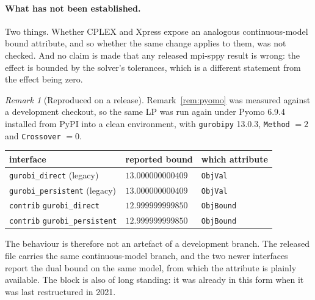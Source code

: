 \documentclass[11pt]{article}
\theoremstyle{plain}
\theoremstyle{remark}
\newtheorem{remark}[lemma]{Remark}
\begin{document}
\paragraph{What has not been established.}
Two things.  Whether CPLEX and Xpress expose an analogous continuous-model
bound attribute, and so whether the same change applies to them, was not
checked.  And no claim is made that any released mpi-sppy result is wrong: the
effect is bounded by the solver's tolerances, which is a different statement
from the effect being zero.

\begin{remark}[Reproduced on a release]\label{rem:release}
Remark~\ref{rem:pyomo} was measured against a development checkout, so the
same LP was run again under Pyomo 6.9.4 installed from PyPI into a clean
environment, with \texttt{gurobipy} 13.0.3, \texttt{Method} $=2$ and
\texttt{Crossover} $=0$.

\begin{center}
\begin{tabular}{lll}
\toprule
interface & reported bound & which attribute \\
\midrule
\texttt{gurobi\_direct} (legacy)     & $13.000000000409$ & \texttt{ObjVal} \\
\texttt{gurobi\_persistent} (legacy) & $13.000000000409$ & \texttt{ObjVal} \\
\texttt{contrib} \texttt{gurobi\_direct}     & $12.999999999850$ & \texttt{ObjBound} \\
\texttt{contrib} \texttt{gurobi\_persistent} & $12.999999999850$ & \texttt{ObjBound} \\
\bottomrule
\end{tabular}
\end{center}

The behaviour is therefore not an artefact of a development branch.  The
released file carries the same continuous-model branch, and the two newer
interfaces report the dual bound on the same model, from which the attribute
is plainly available.  The block is also of long standing: it was already in
this form when it was last restructured in 2021.
\end{remark}
\end{document}
